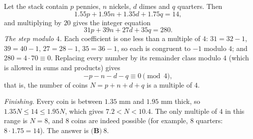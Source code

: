 Let the stack contain $p$ pennies, $n$ nickels, $d$ dimes and $q$ quarters. Then
\[1.55p+1.95n+1.35d+1.75q=14,\]
and multiplying by $20$ gives the integer equation
\[31p+39n+27d+35q=280 .\]
\emph{The step modulo $4$.} Each coefficient is one less than a multiple of $4$: $31=32-1$, $39=40-1$, $27=28-1$, $35=36-1$, so each is congruent to $-1$ modulo $4$; and $280=4\cdot70\equiv0$. Replacing every number by its remainder class modulo $4$ (which is allowed in sums and products) gives
\[-p-n-d-q\equiv0\pmod4,\]
that is, the number of coins $N=p+n+d+q$ is a multiple of $4$.

\emph{Finishing.} Every coin is between $1.35$ mm and $1.95$ mm thick, so $1.35N\le14\le1.95N$, which gives $7.2<N<10.4$. The only multiple of $4$ in this range is $N=8$, and $8$ coins are indeed possible (for example, $8$ quarters: $8\cdot1.75=14$). The answer is $\boxed{\textbf{(B)}\ 8}$.
